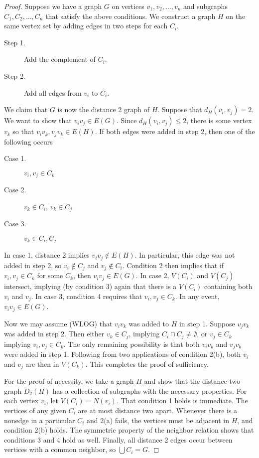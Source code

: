 \begin{proof}
Suppose we have a graph $G$ on vertices $v_1, v_2, \ldots, v_n$ and subgraphs $C_1, C_2, \ldots, C_n$ that satisfy the above conditions.  We construct a graph $H$ on the same vertex set by adding edges in two steps for each $C_i$.
\begin{description}
	\item[Step 1.] Add the complement of $C_i$.
	\item[Step 2.] Add all edges from $v_i$ to $C_i$.
\end{description}
	We claim that $G$ is now the distance 2 graph of $H$.  Suppose that $d_H(v_i, v_j) = 2$.  We want to show that $v_iv_j \in E(G)$.  Since $d_H(v_i,v_j) \leq 2$, there is some vertex $v_k$ so that $v_iv_k, v_jv_k \in E(H)$.  If both edges were added in step 2, then one of the following occurs
\begin{description}
	\item[Case 1.] $v_i, v_j \in C_k$
	\item[Case 2.] $v_k \in C_i$, $v_k \in C_j$
	\item[Case 3.] $v_k \in C_i, C_j$
\end{description}    
In case 1, distance 2 implies $v_iv_j \notin E(H)$. In particular, this edge was not added in step 2, so $v_i \notin C_j$ and $v_j \notin C_i$.  Condition 2 then implies that if $v_i, v_j \in C_k$ for some $C_k$, then $v_iv_j \in E(G)$.  In case 2, $V(C_i)$ and $V(C_j)$ intersect, implying (by condition 3) again that there is a $V(C_l)$ containing both $v_i$ and $v_j$.  In case 3, condition 4 requires that $v_i, v_j \in C_k$.  In any event, $v_iv_j \in E(G)$.

Now we may assume (WLOG) that $v_iv_k$ was added to $H$ in step 1.  Suppose $v_jv_k$ was added in step 2. Then either $v_k \in C_j$, implying $C_i \cap C_j \neq \emptyset$, or $v_j \in C_k$ implying $v_i, v_j \in C_k$.  The only remaining possibility is that both $v_iv_k$ and $v_jv_k$ were added in step 1.  Following from two applications of condition 2(b), both $v_i$ and $v_j$ are then in $V(C_k)$.  This completes the proof of sufficiency.

For the proof of necessity, we take a graph $H$ and show that the distance-two graph $D_2(H)$ has a collection of subgraphs with the necessary properties.  For each vertex $v_i$, let $V(C_i) = N(v_i)$.  That condition 1 holds is immediate.  The vertices of any given $C_i$ are at most distance two apart.  Whenever there is a nonedge in a particular $C_i$ and 2(a) fails, the vertices must be adjacent in $H$, and condition 2(b) holds.  The symmetric property of the neighbor relation shows that conditions 3 and 4 hold as well.  Finally, all distance 2 edges occur between vertices with a common neighbor, so $\bigcup C_i = G$. 
\end{proof}

